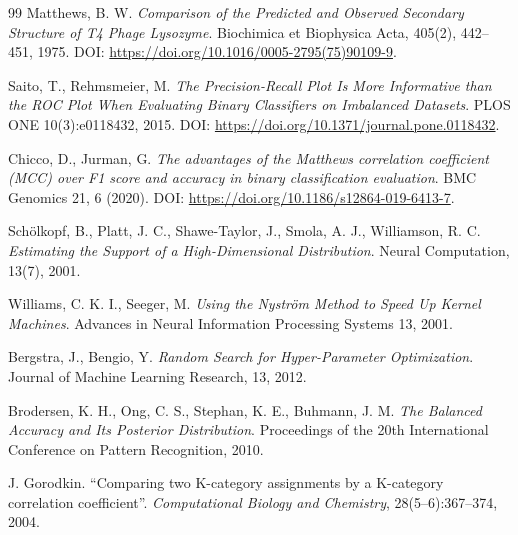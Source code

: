 \documentclass[12pt,oneside]{report}
\begin{document}
\begin{thebibliography}{99}
Matthews, B. W.
\emph{Comparison of the Predicted and Observed Secondary Structure of T4 Phage Lysozyme}.
Biochimica et Biophysica Acta, 405(2), 442--451, 1975. DOI: \url{https://doi.org/10.1016/0005-2795(75)90109-9}.

Saito, T., Rehmsmeier, M.
\emph{The Precision-Recall Plot Is More Informative than the ROC Plot When Evaluating Binary Classifiers on Imbalanced Datasets}.
PLOS ONE 10(3):e0118432, 2015. DOI: \url{https://doi.org/10.1371/journal.pone.0118432}.

Chicco, D., Jurman, G.
\emph{The advantages of the Matthews correlation coefficient (MCC) over F1 score and accuracy in binary classification evaluation}.
BMC Genomics 21, 6 (2020). DOI: \url{https://doi.org/10.1186/s12864-019-6413-7}.


Schölkopf, B., Platt, J. C., Shawe-Taylor, J., Smola, A. J., Williamson, R. C.
\emph{Estimating the Support of a High-Dimensional Distribution}.
Neural Computation, 13(7), 2001.

Williams, C. K. I., Seeger, M.
\emph{Using the Nyström Method to Speed Up Kernel Machines}.
Advances in Neural Information Processing Systems 13, 2001.

Bergstra, J., Bengio, Y.
\emph{Random Search for Hyper-Parameter Optimization}.
Journal of Machine Learning Research, 13, 2012.

Brodersen, K. H., Ong, C. S., Stephan, K. E., Buhmann, J. M.
\emph{The Balanced Accuracy and Its Posterior Distribution}.
Proceedings of the 20th International Conference on Pattern Recognition, 2010.

J. Gorodkin. ``Comparing two K-category assignments by a K-category correlation coefficient''. \textit{Computational Biology and Chemistry}, 28(5--6):367--374, 2004.

\end{thebibliography}
\end{document}
